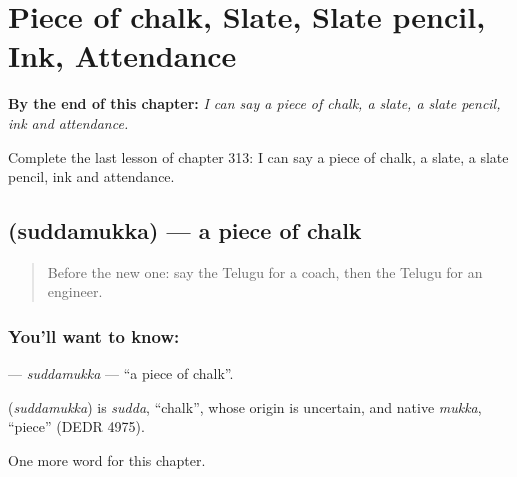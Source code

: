 
\chapter{Piece of chalk, Slate, Slate pencil, Ink, Attendance}
\label{ch:te-piece-of-chalk-slate-slate-pencil-ink-attendance}

\begin{chapteropening}
\textbf{By the end of this chapter:} \emph{I can say a piece of chalk, a slate, a slate pencil, ink and attendance.}

Complete the last lesson of chapter 313: I can say a piece of chalk, a slate, a slate pencil, ink and attendance.
\end{chapteropening}

\section[\texorpdfstring{\te{సుద్దముక్క} (suddamukka)}{సుద్దముక్క (suddamukka)}]{ (suddamukka) — a piece of chalk}

\label{lesson:TE-C313-suddamukka}



\begin{quote}
Before the new one: say the Telugu for a coach, then the Telugu for an engineer.
\end{quote}

\subsection*{You'll want to know: }
\textbf{} — \emph{suddamukka} — \textquotedblleft{}a piece of chalk\textquotedblright{}.

\begin{cousinweb}
\textbf{} (\emph{suddamukka}) is \emph{sudda}, \textquotedblleft{}chalk\textquotedblright{}, whose origin is uncertain, and native \emph{mukka}, \textquotedblleft{}piece\textquotedblright{} (DEDR 4975).
\end{cousinweb}

\begin{grammarlens}[title={What you've built}]
One more word for this chapter.
\end{grammarlens}

